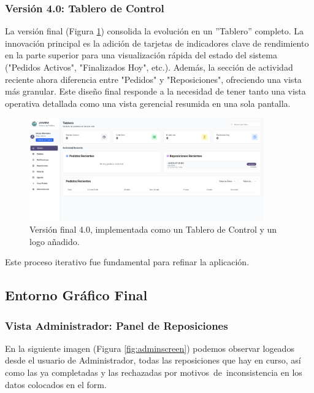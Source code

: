 \documentclass[12pt,letterpaper,spanish]{report}
\begin{document}
\subsubsection{Versión 4.0: Tablero de Control}
La versión final (Figura \ref{fig:v4}) consolida la evolución en un ''Tablero'' completo. La innovación principal es la adición de tarjetas de indicadores clave de rendimiento en la parte superior para una visualización rápida del estado del sistema ("Pedidos Activos", "Finalizados Hoy", etc.). Además, la sección de actividad reciente ahora diferencia entre "Pedidos" y "Reposiciones", ofreciendo una vista más granular. Este diseño final responde a la necesidad de tener tanto una vista operativa detallada como una vista gerencial resumida en una sola pantalla.

\begin{figure}[H]
    \centering
    \includegraphics[width=0.9\textwidth]{V4.0.png}
    \caption{Versión final 4.0, implementada como un Tablero de Control y un logo añadido.}
    \label{fig:v4}
\end{figure}

Este proceso iterativo fue fundamental para refinar la aplicación.



\subsection{Entorno Gráfico Final}
\subsubsection{Vista Administrador: Panel de Reposiciones}
En la siguiente imagen (Figura \ref{fig:adminscreen}) podemos observar logeados desde el usuario de Administrador, todas las reposiciones que hay en curso, así como las ya completadas y las rechazadas por motivos de inconsistencia en los datos colocados en el form.
\end{document}
